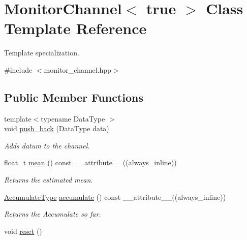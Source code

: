 \hypertarget{classMonitorChannel_3_01true_01_4}{}\section{Monitor\+Channel$<$ true $>$ Class Template Reference}
\label{classMonitorChannel_3_01true_01_4}


Template specialization.  




{\ttfamily \#include $<$monitor\+\_\+channel.\+hpp$>$}

\subsection*{Public Member Functions}
\begin{DoxyCompactItemize}
\item 
{\footnotesize template$<$typename Data\+Type $>$ }\\void \hyperlink{classMonitorChannel_3_01true_01_4_a5de2067c26c85de95bcaafe396a72471}{push\+\_\+back} (Data\+Type data)
\begin{DoxyCompactList}\small\item\em Adds datum to the channel. \end{DoxyCompactList}\item 
float\+\_\+t \hyperlink{classMonitorChannel_3_01true_01_4_a7b95a313ea0263842ff6190d38ff7d7f}{mean} () const \+\_\+\+\_\+attribute\+\_\+\+\_\+((always\+\_\+inline))
\begin{DoxyCompactList}\small\item\em Returns the estimated mean. \end{DoxyCompactList}\item 
\hyperlink{classMonitorChannel_3_01true_01_4_af2569e58417243595e129831ac287351}{Accumulate\+Type} \hyperlink{classMonitorChannel_3_01true_01_4_ade0e235d1f9f6f1624d898e8047b4026}{accumulate} () const \+\_\+\+\_\+attribute\+\_\+\+\_\+((always\+\_\+inline))
\begin{DoxyCompactList}\small\item\em Returns the {\ttfamily Accumulate} so far. \end{DoxyCompactList}\item 
void \hyperlink{classMonitorChannel_3_01true_01_4_a4d555de31d53efa329c4598538da59e7}{reset} ()
\end{DoxyCompactItemize}
